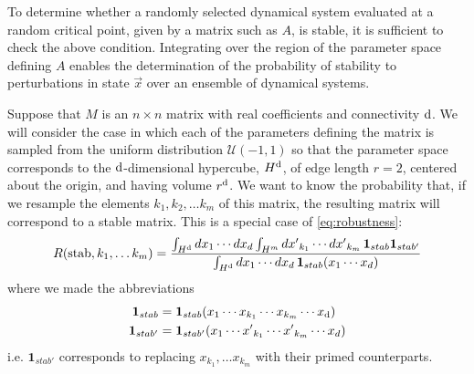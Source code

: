 To determine whether a randomly selected dynamical system evaluated at a random critical point, given by a matrix such as $A$, is stable, it is sufficient to check the above condition. Integrating over the region of the parameter space defining $A$ enables the determination of the probability of stability to perturbations in state $\vec{x}$ over an ensemble of dynamical systems.

Suppose that $M$ is an $n \times n$ matrix with real coefficients and connectivity $\mathrm{d}$. We will consider the case in which each of the parameters defining the matrix is sampled from the uniform distribution $\mathcal{U}(-1,1)$ so that the parameter space corresponds to the $\mathrm{d}$-dimensional hypercube, $H^{\mathrm{d}}$, of edge length $r=2$, centered about the origin, and having volume $r^{\mathrm{d}}$.  We want to know the probability that, if we resample the elements $k_1, k_2, \ldots k_m$ of this matrix, the resulting matrix will correspond to a stable matrix.  This is a special case of \ref{eq:robustness}:
\begin{equation}\label{eq:condprobgen}
 R (\mathrm{stab}, k_1, \ldots k_m) =
  \frac{\int_{H^{\mathrm{d}}} dx_1 \cdots dx_d \int_{H^m} {dx'}_{k_1} \cdots {dx'}_{k_m}\,
    \mathbf{1}_{stab} \mathbf{1}_{stab'}}
  {\int_{H^{\mathrm{d}}} dx_1 \cdots dx_d  \, \mathbf{1}_{stab}(x_1 \cdots x_d)}
\end{equation}
where we made the abbreviations
\begin{align*}
\mathbf{1}_{stab} &= \mathbf{1}_{stab}(x_1 \cdots x_{k_1} \cdots x_{k_m} \cdots x_{\mathrm{d}}) \\
\mathbf{1}_{stab'} &= \mathbf{1}_{stab'}(x_1 \cdots {x'}_{k_1} \cdots {x'}_{k_m}  \cdots x_d)
\end{align*}
i.e. $\mathbf{1}_{stab'}$ corresponds to replacing $x_{k_1}, \ldots x_{k_m}$ with their primed counterparts.

